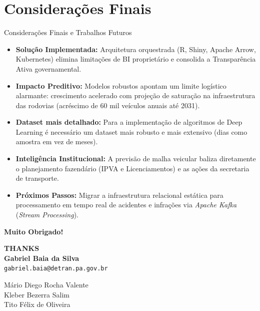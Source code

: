 \documentclass[10pt, aspectratio=169]{beamer}
\begin{document}
\section{Considerações Finais}

\begin{frame}{Considerações Finais e Trabalhos Futuros}
    \begin{itemize}
        \item \textbf{Solução Implementada:} Arquitetura orquestrada (R, Shiny, Apache Arrow, Kubernetes) elimina limitações de BI proprietário e consolida a Transparência Ativa governamental.
        \item \textbf{Impacto Preditivo:} Modelos robustos apontam um limite logístico alarmante: crescimento acelerado com projeção de saturação na infraestrutura das rodovias (acréscimo de 60 mil veículos anuais até 2031).
        \item \textbf{Dataset mais detalhado:} Para a implementação de algoritmos de Deep Learning é necessário um dataset mais robusto e mais extensivo (dias como amostra em vez de meses).
        \item \textbf{Inteligência Institucional:} A previsão de malha veicular baliza diretamente o planejamento fazendário (IPVA e Licenciamentos) e as ações da secretaria de transporte.
        \item \textbf{Próximos Passos:} Migrar a infraestrutura relacional estática para processamento em tempo real de acidentes e infrações via \textit{Apache Kafka} (\textit{Stream Processing}).
    \end{itemize}
\end{frame}

\begin{frame}
    \centering
    \Huge \textbf{Muito Obrigado!}
    \vspace{1cm}
    
    \Huge \textbf{THANKS}
    \vspace{1cm}
    \\
    \large \textbf{Gabriel Baia da Silva} \\
    \normalsize \texttt{gabriel.baia@detran.pa.gov.br}
    
    \vspace{0.5cm}
    \normalsize Mário Diego Rocha Valente \\
    \normalsize Kleber Bezerra Salim \\
    \normalsize Tito Félix de Oliveira
\end{frame}
\end{document}
